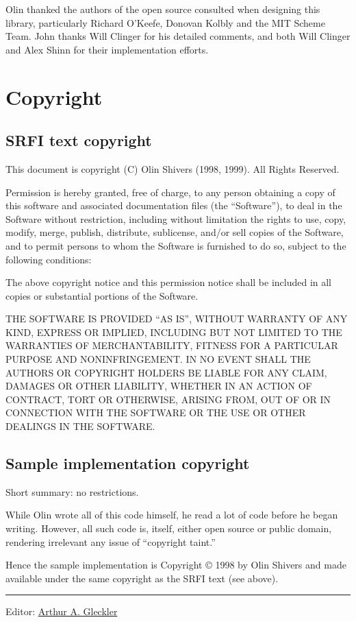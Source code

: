 Olin thanked the authors of the open source consulted when designing
this library, particularly Richard O'Keefe, Donovan Kolbly and the MIT
Scheme Team. John thanks Will Clinger for his detailed comments, and
both Will Clinger and Alex Shinn for their implementation efforts.

\section{Copyright}\label{copyright}

\subsection{SRFI text copyright}\label{SRFItextcopyright}

This document is copyright (C) Olin Shivers (1998, 1999). All Rights
Reserved.

Permission is hereby granted, free of charge, to any person obtaining a
copy of this software and associated documentation files (the
``Software''), to deal in the Software without restriction, including
without limitation the rights to use, copy, modify, merge, publish,
distribute, sublicense, and/or sell copies of the Software, and to
permit persons to whom the Software is furnished to do so, subject to
the following conditions:

The above copyright notice and this permission notice shall be included
in all copies or substantial portions of the Software.

THE SOFTWARE IS PROVIDED ``AS IS'', WITHOUT WARRANTY OF ANY KIND,
EXPRESS OR IMPLIED, INCLUDING BUT NOT LIMITED TO THE WARRANTIES OF
MERCHANTABILITY, FITNESS FOR A PARTICULAR PURPOSE AND NONINFRINGEMENT.
IN NO EVENT SHALL THE AUTHORS OR COPYRIGHT HOLDERS BE LIABLE FOR ANY
CLAIM, DAMAGES OR OTHER LIABILITY, WHETHER IN AN ACTION OF CONTRACT,
TORT OR OTHERWISE, ARISING FROM, OUT OF OR IN CONNECTION WITH THE
SOFTWARE OR THE USE OR OTHER DEALINGS IN THE SOFTWARE.

\subsection{Sample implementation
copyright}\label{Sampleimplementationcopyright}

Short summary: no restrictions.

While Olin wrote all of this code himself, he read a lot of code before
he began writing. However, all such code is, itself, either open source
or public domain, rendering irrelevant any issue of ``copyright taint.''

Hence the sample implementation is Copyright © 1998 by Olin Shivers and
made available under the same copyright as the SRFI text (see above).

\begin{center}\rule{0.5\linewidth}{\linethickness}\end{center}

Editor:
\href{mailto:srfi-editors\%20at\%20srfi\%20dot\%20schemers\%20dot\%20org}{Arthur
A. Gleckler}
